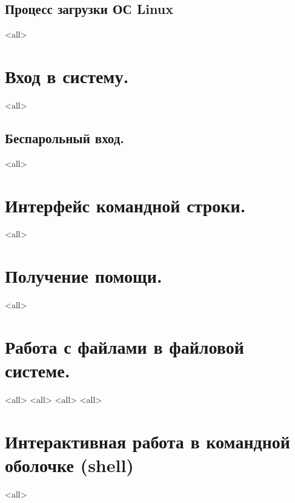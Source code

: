 \subsection{Процесс загрузки ОС Linux}
\mode<all>{}


\section{Вход в систему.}
\mode<all>{}
\subsection{Беспарольный вход.}
\mode<all>{}

\section{Интерфейс командной строки.}
\mode<all>{}

\section{Получение помощи.}
\mode<all>{}

\section{Работа с файлами в файловой системе.}
\mode<all>{}
\mode<all>{}
\mode<all>{}
\mode<all>{}
\section{Интерактивная работа в командной оболочке (shell)}
\mode<all>{}

\bye
